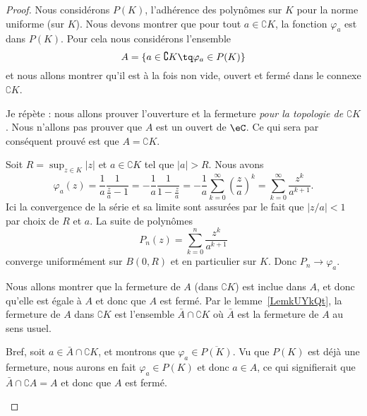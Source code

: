 \begin{proof}
	Nous considérons \( P(K)\), l'adhérence des polynômes sur \( K\) pour la norme uniforme (sur \( K\)). Nous devons montrer que pour tout \( a\in \complement K\), la fonction \( \varphi_a\) est dans \( P(K)\). Pour cela nous considérons l'ensemble
	\begin{equation}
		A=\{ a\in\complement K\tq \varphi_a\in P(K) \}
	\end{equation}
	et nous allons montrer qu'il est à la fois non vide, ouvert et fermé dans le connexe \( \complement K\).

	Je répète : nous allons prouver l'ouverture et la fermeture \emph{pour la topologie de \( \complement K\)}. Nous n'allons pas prouver que \( A\) est un ouvert de \( \eC\). Ce qui sera par conséquent prouvé est que \( A=\complement K\).

	\begin{subproof}
		 Soit \( R=\sup_{z\in K}| z |\) et \( a\in \complement K\) tel que \( | a |>R\). Nous avons
		\begin{equation}
			\varphi_a(z)=\frac{1}{ a }\frac{1}{ \frac{ z }{ a }-1 }
			=-\frac{1}{ a }\frac{1}{ 1-\frac{ z }{ a } }
			=-\frac{1}{ a }\sum_{k=0}^{\infty}\left( \frac{ z }{ a } \right)^k
			=\sum_{k=0}^{\infty}\frac{ z^k }{ a^{k+1} }.
		\end{equation}
		Ici la convergence de la série et sa limite sont assurées par le fait que \( | z/a |<1\) par choix de \( R\) et \( a\). La suite de polynômes
		\begin{equation}
			P_n(z)=\sum_{k=0}^n\frac{ z^k }{ a^{k+1} }
		\end{equation}
		converge uniformément sur \( B(0,R)\) et en particulier sur \( K\). Donc \( P_n\to \varphi_a\).

		\spitem[Fermé]

		Nous allons montrer que la fermeture de \( A\) (dans \( \complement K\)) est inclue dans \( A\), et donc qu'elle est égale à \( A\) et donc que \( A\) est fermé. Par le lemme~\ref{LemkUYkQt}, la fermeture de \( A\) dans \( \complement K\) est l'ensemble \( \bar A\cap\complement K\) où \( \bar A\) est la fermeture de \( A\) au sens usuel.

		Bref, soit \( a\in \bar A\cap\complement K\), et montrons que \( \varphi_a\in \overline{ P(K) }\). Vu que \( P(K)\) est déjà une fermeture, nous aurons en fait \( \varphi_a\in P(K)\) et donc \( a\in A\), ce qui signifierait que \( \bar A\cap\complement A=A\) et donc que \( A\) est fermé.


\end{subproof}
\end{proof}
